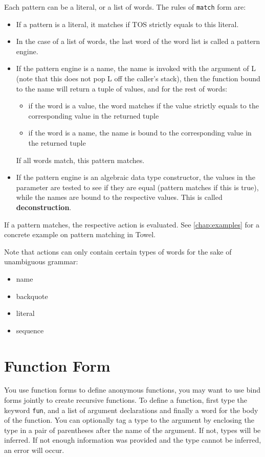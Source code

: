 \documentclass{book}
\begin{document}
Each pattern can be a literal, or a list of words. The rules of \texttt{match} form are:
\begin{itemize}
\item If a pattern is a literal, it matches if TOS strictly equals to
  this literal.
\item In the case of a list of words, the last word of the word list
  is called a pattern engine.
\item If the pattern engine is a name, the name is invoked with the argument of L (note that
  this does not pop L off the caller's stack), then the function bound
  to the name will return a tuple of values, and for the rest of
  words:
  \begin{itemize}
  \item if the word is a value, the word matches if the value strictly
    equals to the corresponding value in the returned tuple
  \item if the word is a name, the name is bound to the corresponding
    value in the returned tuple
  \end{itemize}
  If all words match, this pattern matches.
\item If the pattern engine is an algebraic data type constructor, the values in the parameter are tested to see if they are equal (pattern matches if this is true), while the names are bound to the respective values. This is called \textbf{deconstruction}.
\end{itemize}

If a pattern matches, the respective action is evaluated. See \autoref{chap:examples} for a concrete example on pattern matching in Towel.

Note that actions can only contain certain types of words for the sake of unambiguous grammar:
\begin{itemize}
\item name
\item backquote
\item literal
\item sequence
\end{itemize}

\section{Function Form}

You use function forms to define anonymous functions, you may want to use bind forms jointly to create recursive functions. To define a function, first type the keyword \texttt{fun}, and a list of argument declarations and finally a word for the body of the function. You can optionally tag a type to the argument by enclosing the type in a pair of parentheses after the name of the argument. If not, types will be inferred. If not enough information was provided and the type cannot be inferred, an error will occur.
\end{document}
